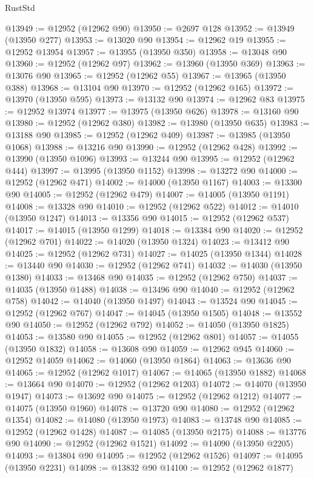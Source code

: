 \begin{lexlean}{RustStd}
\begin{coremodule}
@13949 := @12952 (@12962 @90)
@13950 := @2697 @128
@13952 := @13949 (@13950 @277)
@13953 := @13020 @90
@13954 := @12962 @19
@13955 := @12952 @13954
@13957 := @13955 (@13950 @350)
@13958 := @13048 @90
@13960 := @12952 (@12962 @97)
@13962 := @13960 (@13950 @369)
@13963 := @13076 @90
@13965 := @12952 (@12962 @55)
@13967 := @13965 (@13950 @388)
@13968 := @13104 @90
@13970 := @12952 (@12962 @165)
@13972 := @13970 (@13950 @595)
@13973 := @13132 @90
@13974 := @12962 @83
@13975 := @12952 @13974
@13977 := @13975 (@13950 @626)
@13978 := @13160 @90
@13980 := @12952 (@12962 @380)
@13982 := @13980 (@13950 @635)
@13983 := @13188 @90
@13985 := @12952 (@12962 @409)
@13987 := @13985 (@13950 @1068)
@13988 := @13216 @90
@13990 := @12952 (@12962 @428)
@13992 := @13990 (@13950 @1096)
@13993 := @13244 @90
@13995 := @12952 (@12962 @444)
@13997 := @13995 (@13950 @1152)
@13998 := @13272 @90
@14000 := @12952 (@12962 @471)
@14002 := @14000 (@13950 @1167)
@14003 := @13300 @90
@14005 := @12952 (@12962 @479)
@14007 := @14005 (@13950 @1191)
@14008 := @13328 @90
@14010 := @12952 (@12962 @522)
@14012 := @14010 (@13950 @1247)
@14013 := @13356 @90
@14015 := @12952 (@12962 @537)
@14017 := @14015 (@13950 @1299)
@14018 := @13384 @90
@14020 := @12952 (@12962 @701)
@14022 := @14020 (@13950 @1324)
@14023 := @13412 @90
@14025 := @12952 (@12962 @731)
@14027 := @14025 (@13950 @1344)
@14028 := @13440 @90
@14030 := @12952 (@12962 @741)
@14032 := @14030 (@13950 @1380)
@14033 := @13468 @90
@14035 := @12952 (@12962 @750)
@14037 := @14035 (@13950 @1488)
@14038 := @13496 @90
@14040 := @12952 (@12962 @758)
@14042 := @14040 (@13950 @1497)
@14043 := @13524 @90
@14045 := @12952 (@12962 @767)
@14047 := @14045 (@13950 @1505)
@14048 := @13552 @90
@14050 := @12952 (@12962 @792)
@14052 := @14050 (@13950 @1825)
@14053 := @13580 @90
@14055 := @12952 (@12962 @801)
@14057 := @14055 (@13950 @1832)
@14058 := @13608 @90
@14059 := @12962 @945
@14060 := @12952 @14059
@14062 := @14060 (@13950 @1864)
@14063 := @13636 @90
@14065 := @12952 (@12962 @1017)
@14067 := @14065 (@13950 @1882)
@14068 := @13664 @90
@14070 := @12952 (@12962 @1203)
@14072 := @14070 (@13950 @1947)
@14073 := @13692 @90
@14075 := @12952 (@12962 @1212)
@14077 := @14075 (@13950 @1960)
@14078 := @13720 @90
@14080 := @12952 (@12962 @1354)
@14082 := @14080 (@13950 @1973)
@14083 := @13748 @90
@14085 := @12952 (@12962 @1428)
@14087 := @14085 (@13950 @2175)
@14088 := @13776 @90
@14090 := @12952 (@12962 @1521)
@14092 := @14090 (@13950 @2205)
@14093 := @13804 @90
@14095 := @12952 (@12962 @1526)
@14097 := @14095 (@13950 @2231)
@14098 := @13832 @90
@14100 := @12952 (@12962 @1877)

\end{coremodule}
\end{lexlean}
